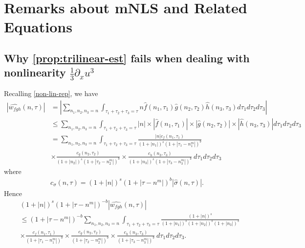 \documentclass[12pt,reqno]{amsart}
\numberwithin{equation}{section}  %
\numberwithin{figure}{section}
\newcommand{\wh}{\widehat}
\newcommand{\p}{\partial}
\theoremstyle{plain}
\theoremstyle{definition}
\theoremstyle{remark}
\begin{document}
\section{Remarks about mNLS and Related Equations}
%
\subsection{Why \autoref{prop:trilinear-est} fails when dealing
with nonlinearity $\frac{1}{3} \p_x u^3$}
%
%
%
Recalling \eqref{non-lin-rep}, we have
\begin{equation}
	\begin{split}
		| \wh{w_{fgh}}(n, \tau)|
    & = | \sum_{n_1, n_2, n_3 = n}  \int_{\tau_{1} + \tau_{2} + \tau_{3} = \tau}
    n \wh{f}\left( n_1,  \tau_1 
\right) \wh{g}\left( n_2, \tau_2  
\right) \wh{h}\left( n_3, \tau_3 \right) d \tau_1 d \tau_2 d \tau_3 |
\\
& \le \sum_{n_1, n_2, n_3 = n}  \int_{\tau_{1} + \tau_{2} + \tau_{3} = \tau}
| n | \times | \wh{f}\left( n_1, \tau_1 
\right) | \times  | \wh{g}\left( n_2, \tau_2 
\right) | \times | \wh{ h}\left( n_3, \tau_3 \right) | d \tau_1 d \tau_2 d 
\tau_3
\\
& = \sum_{n_1, n_2, n_3 = n}  \int_{\tau_{1} + \tau_{2} + \tau_{3} = \tau} \frac{| n |c_f\left( n_1, \tau_1 
\right)}{\left (1 + |n_1| \right )^s \left( 1 + | \tau_1 - n_1^{m} | \right)^{b}}
\\
& \times \frac{c_{g}\left( n_2, \tau_2 \right)}{\left (1 + |n_2| \right ) 
^s\left( 1 + | \tau_2 -  n_2^{m }| 
\right)^{b}}
 \times \frac{c_{h}\left( n_3, \tau_3 \right)}{\left (1 + |n_3| \right ) ^s\left( 1 + | 
\tau_3 - n_3^{m } | \right)^{b}} \ d \tau_1 d \tau_2 d \tau_3
\end{split}
\end{equation}
where 
%
%
\begin{equation*}
	\begin{split}
		c_\sigma(n, \tau) = \left (1 + |n| \right ) ^s \left( 1 + | \tau - n^{m } |  
		\right)^{b} | \wh{\sigma}\left( n, \tau \right) | .
	\end{split}
\end{equation*}
%
%
Hence
%
%
\begin{equation*}
	\begin{split}
		 & \left (1 + |n| \right )^s \left( 1 + | \tau - n^{m } | \right)^{-b} | \wh{w_{fgh}}\left( 
		n, \tau \right) |
		\\
		& \le \left( 1 + | \tau - n^{m } | \right)^{-b}
		\sum_{n_1, n_2, n_3 = n}  \int_{\tau_{1} + \tau_{2} + \tau_{3} = \tau}
    \frac{\left (1 + |n| \right )^s}{\left (1 +
		|n_1| \right )^s \left (1 + | n_2| \right )^s \left (1 + |n_3| \right )^s} 
		\\
    & \times \frac{c_f(n_1, \tau_1)}{\left( 1 + | \tau_1 - n_1^{m } | 
		\right)^{b}}
		\times
		\frac{c_g(n_2, \tau_2)}{\left( 1 + | \tau_2 - n_2^{m } | 
		\right)^{b}} \times
		\frac{c_h(n_3, \tau_3)}{\left( 1 + | \tau_3 - n_3^{m } | 
		\right)^{b}}\ d \tau_1 d \tau_2 d \tau_3.
	\end{split}
\end{equation*}
\end{document}

